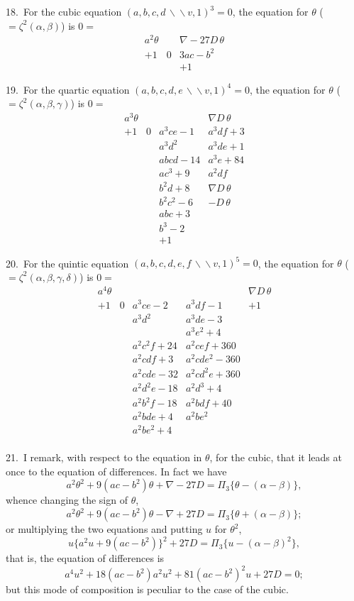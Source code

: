 \documentclass[11pt,a4paper]{book}
\begin{document}
\newpage
\setcounter{page}{306}

18.\ For the cubic equation $(a,b,c,d\,\backslash\!\!\backslash v, 1)^3=0$, the equation for $\theta$ ($=\zeta^2(\alpha,\beta)$) is $0=$
\[
\begin{array}{ccc}
a^2\theta & & \nabla-27D\,\theta\\
+1 & 0 & 3ac-b^2\\
& & +1
\end{array}
\]

19.\ For the quartic equation $(a,b,c,d,e\,\backslash\!\!\backslash v, 1)^4=0$, the equation for $\theta$ ($=\zeta^2(\alpha,\beta,\gamma)$) is $0=$
\[
\begin{array}{cccc}
a^3\theta & & & \nabla D\,\theta\\
+1 & 0 & a^3ce-1 & a^3df+3\\
& & a^3d^2 & a^3de+1\\
& & abcd-14 & a^3e+84\\
& & ac^3+9 & a^2df\\
& & b^2d+8 & \nabla D\,\theta\\
& & b^2c^2-6 & -D\,\theta\\
& & abc+3 & \\
& & b^3-2 & \\
& & +1 &
\end{array}
\]

20.\ For the quintic equation $(a,b,c,d,e,f\,\backslash\!\!\backslash v, 1)^5=0$, the equation for $\theta$ ($=\zeta^2(\alpha,\beta,\gamma,\delta)$) is $0=$
\[
\begin{array}{ccccc}
a^4\theta & & & & \nabla D\,\theta\\
+1 & 0 & a^3ce-2 & a^3df-1 & +1\\
& & a^3d^2 & a^3de-3 & \\
& & & a^3e^2+4 & \\
& & a^2c^2f+24 & a^2cef+360 & \\
& & a^2cdf+3 & a^2cde^2-360 & \\
& & a^2cde-32 & a^2cd^2e+360 & \\
& & a^2d^2e-18 & a^2d^3+4 & \\
& & a^2b^2f-18 & a^2bdf+40 & \\
& & a^2bde+4 & a^2be^2 & \\
& & a^2be^2+4 & & \\
\end{array}
\]

\newpage
\setcounter{page}{307}

21.\ I remark, with respect to the equation in $\theta$, for the cubic, that it leads at once to the equation of differences. In fact we have
\[
a^2\theta^2 + 9(ac-b^2)\theta + \nabla-27D = \Pi_3\{\theta-(\alpha-\beta)\},
\]
whence changing the sign of $\theta$,
\[
a^2\theta^2 + 9(ac-b^2)\theta - \nabla+27D = \Pi_3\{\theta+(\alpha-\beta)\};
\]
or multiplying the two equations and putting $u$ for $\theta^2$,
\[
u\{a^2u+9(ac-b^2)\}^2 + 27D = \Pi_3\{u-(\alpha-\beta)^2\},
\]
that is, the equation of differences is
\[
a^4u^2 + 18(ac-b^2)a^2u^2 + 81(ac-b^2)^2u + 27D = 0;
\]
but this mode of composition is peculiar to the case of the cubic.
\end{document}
